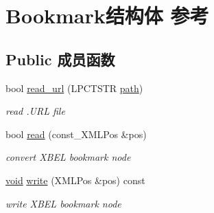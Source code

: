 \hypertarget{struct_bookmark}{}\section{Bookmark结构体 参考}
\label{struct_bookmark}
\subsection*{Public 成员函数}
\begin{DoxyCompactItemize}
\item 
\mbox{\label{struct_bookmark_a9f86200ef8150ba348cce324ab54c1c5}} 
bool \hyperlink{struct_bookmark_a9f86200ef8150ba348cce324ab54c1c5}{read\+\_\+url} (L\+P\+C\+T\+S\+TR \hyperlink{structpath}{path})
\begin{DoxyCompactList}\small\item\em read .U\+RL file \end{DoxyCompactList}\item 
\mbox{\label{struct_bookmark_ab370ed91cac1a3ddb2a095bef85dd7cb}} 
bool \hyperlink{struct_bookmark_ab370ed91cac1a3ddb2a095bef85dd7cb}{read} (const\+\_\+\+X\+M\+L\+Pos \&pos)
\begin{DoxyCompactList}\small\item\em convert X\+B\+EL bookmark node \end{DoxyCompactList}\item 
\mbox{\label{struct_bookmark_a9259664fa80692be5dec9e77f9e5a4fa}} 
\hyperlink{interfacevoid}{void} \hyperlink{struct_bookmark_a9259664fa80692be5dec9e77f9e5a4fa}{write} (X\+M\+L\+Pos \&pos) const
\begin{DoxyCompactList}\small\item\em write X\+B\+EL bookmark node \end{DoxyCompactList}\end{DoxyCompactItemize}

